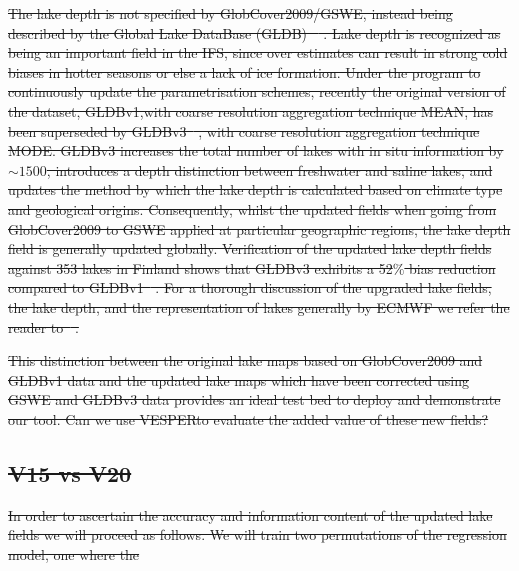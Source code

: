 \documentclass[hess, twostagejnl]{copernicus}
\providecommand{\DIFadd}[1]{{\protect\color{blue}\uwave{#1}}} %
\providecommand{\DIFdel}[1]{{\protect\color{red}\sout{#1}}}                      %
\providecommand{\DIFaddbegin}{} %
\providecommand{\DIFaddend}{} %
\providecommand{\DIFdelbegin}{} %
\providecommand{\DIFdelend}{} %
\begin{document}
\DIFdel{The lake depth is not specified by GlobCover2009/GSWE, instead being described by the Global Lake DataBase (GLDB) \mbox{%
\cite{Kourzeneva2012}}\hskip0pt%
. Lake depth is recognized as being an important field in the IFS, since over estimates can result in strong cold biases in hotter seasons or else a lack of ice formation. Under the program to continuously update the parametrisation schemes, recently the original version of the dataset, GLDBv1,with coarse resolution aggregation technique MEAN, has been superseded by GLDBv3\mbox{%
\cite{Choulga2014}}\hskip0pt%
, with coarse resolution aggregation technique MODE. GLDBv3 increases the total number of lakes with in situ information by $\sim1500$, introduces a depth distinction between freshwater and saline lakes, and updates the method by which the lake depth is calculated based on climate type and geological origins. Consequently, whilst the updated fields when going from GlobCover2009 to GSWE applied at particular geographic regions, the lake depth field is generally updated globally. Verification of the updated lake depth fields against 353 lakes in Finland shows that GLDBv3 exhibits a 52$\%$ bias reduction compared to GLDBv1\mbox{%
\cite{Choulga2019}}\hskip0pt%
. For a thorough discussion of the upgraded lake fields, the lake depth, and the representation of lakes generally by ECMWF we refer the reader to\mbox{%
\cite{Choulga2019,Boussetta2021}}\hskip0pt%
. }\DIFdelend \DIFaddbegin \DIFadd{3.0K for VESPER\_V15. }\DIFaddend \newline 

 \DIFdelbegin %
\DIFdel{This distinction between the original lake maps based on GlobCover2009 and GLDBv1 data and the updated lake maps which have been corrected using GSWE and GLDBv3 data provides an ideal test bed to deploy and demonstrate our tool. Can we use VESPERto evaluate the added value of these new fields? 
}%

\subsection{\DIFdel{V15 vs V20}}
\addtocounter{subsection}{-1}%
\DIFdel{In order to ascertain the accuracy and information content of the updated lake fields we will proceed as follows. We will train two permutations of the regression model, one where the }\DIFdelend 
\end{document}
